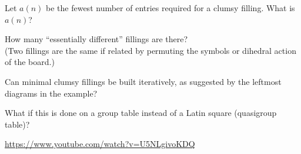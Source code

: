 \documentclass{article}
\begin{document}
\begin{question}
  Let $a(n)$ be the fewest number of entries required for a clumsy filling.
  What is $a(n)$?
\end{question}

\begin{related}
  \item How many ``essentially different'' fillings are there? \\
  (Two fillings are the same if related by permuting the symbols or
  dihedral action of the board.)
  \item Can minimal clumsy fillings be built iteratively, as suggested by the
  leftmost diagrams in the example?
  \item What if this is done on a group table instead of a Latin square
  (quasigroup table)?
\end{related}

\begin{references}
  \item \url{https://www.youtube.com/watch?v=U5NLgivoKDQ}
\end{references}
\end{document}
